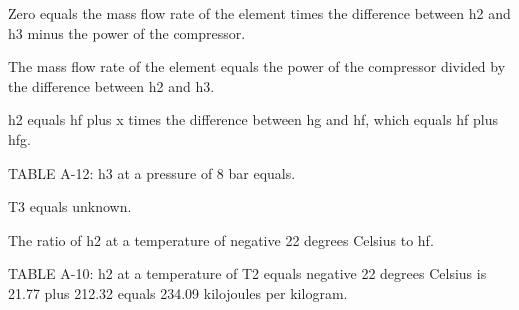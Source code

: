 Zero equals the mass flow rate of the element times the difference between h2 and h3 minus the power of the compressor.

The mass flow rate of the element equals the power of the compressor divided by the difference between h2 and h3.

h2 equals hf plus x times the difference between hg and hf, which equals hf plus hfg.

TABLE A-12: h3 at a pressure of 8 bar equals.

T3 equals unknown.

The ratio of h2 at a temperature of negative 22 degrees Celsius to hf.

TABLE A-10: h2 at a temperature of T2 equals negative 22 degrees Celsius is 21.77 plus 212.32 equals 234.09 kilojoules per kilogram.